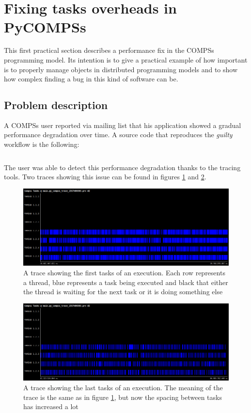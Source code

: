 \newpage
\section{Fixing tasks overheads in PyCOMPSs}
\label{sec:task_overhead}
This first practical section describes a performance fix in the COMPSs programming model. Its intention is to give a practical example of how important is to properly manage objects in distributed programming models and to show how complex finding a bug in this kind of software can be.

\subsection{Problem description}
A COMPSs user reported via mailing list that his application showed a gradual performance degradation over time. A source code that reproduces the \textit{guilty} workflow is the following:

\inputminted{python}{applications/TASK_OVERHEAD/main.py}

The user was able to detect this performance degradation thanks to the tracing tools. Two traces showing this issue can be found in figures \ref{fig:zoom_task_early} and \ref{fig:zoom_task_late}.

\begin{figure}
\centering
\includegraphics[scale = 0.3]{figures/zoom_task_early.png}
\caption{A trace showing the first tasks of an execution. Each row represents a thread, blue represents a task being executed and black that either the thread is waiting for the next task or it is doing something else}
\label{fig:zoom_task_early}
\end{figure}

\begin{figure}
\centering
\includegraphics[scale = 0.3]{figures/zoom_task_late.png}
\caption{A trace showing the last tasks of an execution. The meaning of the trace is the same as in figure \ref{fig:zoom_task_early}, but now the spacing between tasks has increased a lot}
\label{fig:zoom_task_late}
\end{figure}

